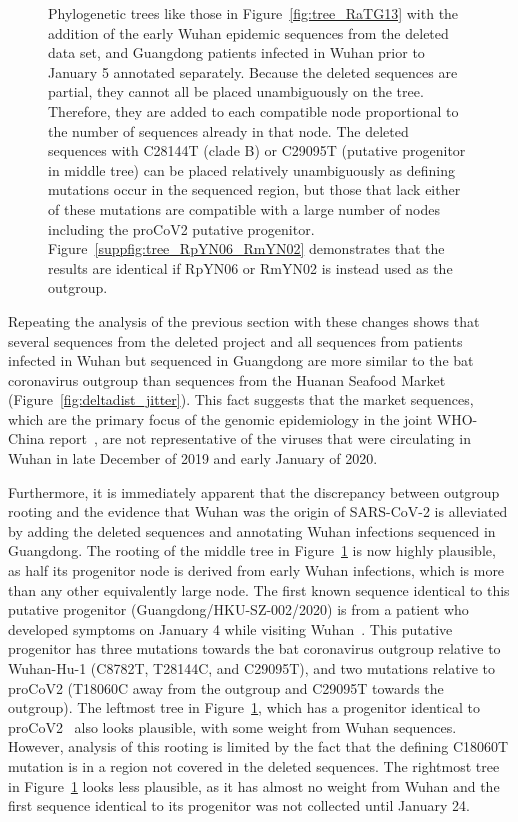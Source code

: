 \documentclass[9pt,twocolumn,twoside]{gsajnl_modified}
\begin{document}
\begin{figure}
{ }
 \caption{
Phylogenetic trees like those in Figure~\ref{fig:tree_RaTG13} with the addition of the early Wuhan epidemic sequences from the deleted data set, and Guangdong patients infected in Wuhan prior to January 5 annotated separately.
Because the deleted sequences are partial, they cannot all be placed unambiguously on the tree.
Therefore, they are added to each compatible node proportional to the number of sequences already in that node.
The deleted sequences with C28144T (clade B) or C29095T (putative progenitor in middle tree) can be placed relatively unambiguously as defining mutations occur in the sequenced region, but those that lack either of these mutations are compatible with a large number of nodes including the proCoV2 putative progenitor.
 Figure~\ref{suppfig:tree_RpYN06_RmYN02} demonstrates that the results are identical if RpYN06 or RmYN02 is instead used as the outgroup.
\label{fig:tree_with_deleted}
 }
 \end{figure}

Repeating the analysis of the previous section with these changes shows that several sequences from the deleted project and all sequences from patients infected in Wuhan but sequenced in Guangdong are more similar to the bat coronavirus outgroup than sequences from the Huanan Seafood Market (Figure~\ref{fig:deltadist_jitter}).
This fact suggests that the market sequences, which are the primary focus of the genomic epidemiology in the joint WHO-China report~\citep{WHO2021origins}, are not representative of the viruses that were circulating in Wuhan in late December of 2019 and early January of 2020.

Furthermore, it is immediately apparent that the discrepancy between outgroup rooting and the evidence that Wuhan was the origin of SARS-CoV-2 is alleviated by adding the deleted sequences and annotating Wuhan infections sequenced in Guangdong.
The rooting of the middle tree in Figure~\ref{fig:tree_with_deleted} is now highly plausible, as half its progenitor node is derived from early Wuhan infections, which is more than any other equivalently large node.
The first known sequence identical to this putative progenitor (Guangdong/HKU-SZ-002/2020) is from a patient who developed symptoms on January 4 while visiting Wuhan~\citep{chan2020familial}.
This putative progenitor has three mutations towards the bat coronavirus outgroup relative to Wuhan-Hu-1 (C8782T, T28144C, and C29095T), and two mutations relative to proCoV2 (T18060C away from the outgroup and C29095T towards the outgroup).
The leftmost tree in Figure~\ref{fig:tree_with_deleted}, which has a progenitor identical to proCoV2~\citep{kumar2021evolutionary} also looks plausible, with some weight from Wuhan sequences.
However, analysis of this rooting is limited by the fact that the defining C18060T mutation is in a region not covered in the deleted sequences.
The rightmost tree in Figure~\ref{fig:tree_with_deleted} looks less plausible, as it has almost no weight from Wuhan and the first sequence identical to its progenitor was not collected until January 24.
\end{document}
